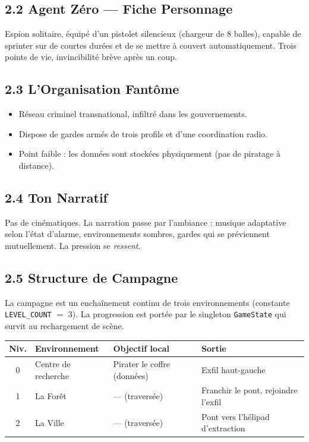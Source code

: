 \documentclass[11pt,a4paper]{article}
\newcommand{\code}[1]{\colorbox{codebg}{\texttt{#1}}}
\newcommand{\param}[2]{\code{#1} $=$ #2}
\begin{document}
\subsection{2.2 Agent Z\'ero --- Fiche Personnage}
Espion solitaire, \'equip\'e d'un pistolet silencieux (chargeur de 8 balles),
capable de sprinter sur de courtes dur\'ees et de se mettre \`a couvert
automatiquement. Trois points de vie, invincibilit\'e br\`eve apr\`es un coup.

\subsection{2.3 L'Organisation Fant\^ome}
\begin{itemize}[leftmargin=*]
  \item R\'eseau criminel transnational, infiltr\'e dans les gouvernements.
  \item Dispose de gardes arm\'es de trois profils et d'une coordination radio.
  \item Point faible : les donn\'ees sont stock\'ees physiquement (pas de piratage \`a distance).
\end{itemize}

\subsection{2.4 Ton Narratif}
Pas de cin\'ematiques. La narration passe par l'ambiance : musique adaptative
selon l'\'etat d'alarme, environnements sombres, gardes qui se pr\'eviennent
mutuellement. La pression se \emph{ressent}.

\subsection{2.5 Structure de Campagne}
La campagne est un encha\^inement continu de trois environnements
(constante \param{LEVEL\_COUNT}{3}). La progression est port\'ee par le singleton
\code{GameState} qui survit au rechargement de sc\`ene.

\begin{center}
\begin{tabular}{clll}
\toprule
\textbf{Niv.} & \textbf{Environnement} & \textbf{Objectif local} & \textbf{Sortie} \\
\midrule
0 & Centre de recherche & Pirater le coffre (donn\'ees) & Exfil haut-gauche \\
1 & La For\^et & --- (traversée) & Franchir le pont, rejoindre l'exfil \\
2 & La Ville & --- (traversée) & Pont vers l'h\'elipad d'extraction \\
\bottomrule
\end{tabular}
\end{center}
\end{document}
